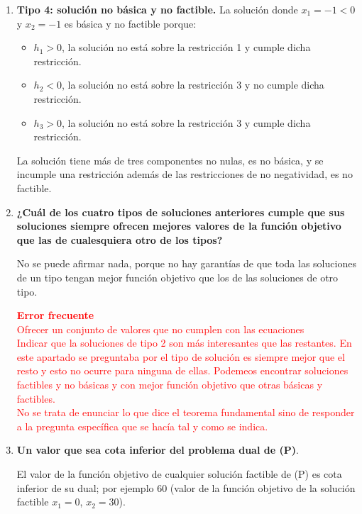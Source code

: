 \begin{enumerate}
    \textcolor{red}{\textbf{Error frecuente} \\
    Elegir tres variables y asignarles valor diferente de cero -alguno negativo- y el asignar al resto de variables valor nulo.\\
    Si se eligen tres variables como no nulas y el resto nulas, las tres primeras deben corresponder a una base y, por lo tanto, deben tener los valores resultantes de resolver las ecuaciones cuando se eliminan las variables no básicas.\\
    Por ejemplo, una solución del tipo $x^T=\begin{array}{ccccc}(-100 & -100 & -5 & 0 & 0)\end{array}$ no es básica porque cuando se seleccionan como variables básicas $x_1$, $x_2$ y $h_1$, es decir, si $h_2=h_3=0$, los valores de $x_1$, $x_2$ y $h_1$ no son, respectivamente -100, -100 y -5.}
    
    \item \textbf{Tipo 4: solución no básica y no factible.}
    La solución donde $x_1 = -1 < 0$ y $x_2=-1$ es básica y no factible porque:
    \begin{itemize}
        \item $h_1>0$, la solución no está sobre la restricción 1 y cumple dicha restricción.
        \item $h_2<0$, la solución no está sobre la restricción 3 y no cumple dicha restricción.
        \item $h_3>0$, la solución no está sobre la restricción 3 y cumple dicha restricción.
    \end{itemize}
    La solución tiene más de tres componentes no nulas, es no básica, y se incumple una restricción además de las restricciones de no negatividad, es no factible.
    \item \textbf{¿Cuál de los cuatro tipos de soluciones anteriores cumple que sus soluciones siempre ofrecen mejores valores de la función objetivo que las de cualesquiera otro de los tipos?}
    
    No se puede afirmar nada, porque no hay garantías de que toda las soluciones de un tipo tengan mejor función objetivo que los de las soluciones de otro tipo.

    \textcolor{red}{\textbf{Error frecuente} \\
    Ofrecer un conjunto de valores que no cumplen con las ecuaciones\\
    Indicar que la soluciones de tipo 2 son más interesantes que las restantes. En este apartado se preguntaba por el tipo de solución es siempre mejor que el resto y esto no ocurre para ninguna de ellas. Podemeos encontrar soluciones factibles y no básicas y con mejor función objetivo que otras básicas y factibles.\\    
    No se trata de enunciar lo que dice el teorema fundamental sino de responder a la pregunta específica que se hacía tal y como se indica.}

    \item \textbf{Un valor que sea cota inferior del problema dual de (P)}.
    
    El valor de la función objetivo de cualquier solución factible de (P) es cota inferior de su dual; por ejemplo 60 (valor de la función objetivo de la solución factible $x_1=0$, $x_2=30$).

\end{enumerate}